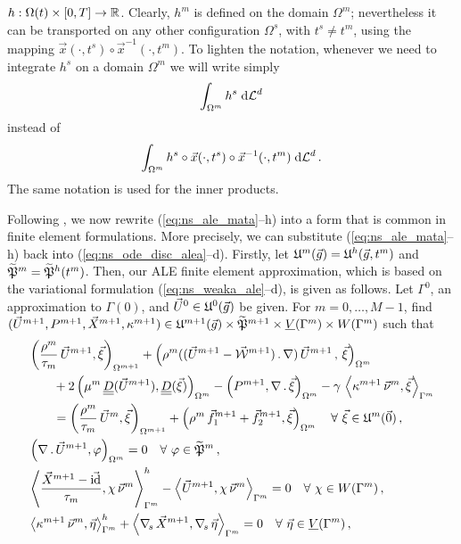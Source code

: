 $h:\Omega(t)\times[0,T]\to\R$. Clearly, $h^m$ is defined on the domain
$\Omega^m$; nevertheless it can be transported on any other configuration
$\Omega^s$, with $t^s\neq t^m$, using the mapping $\vec x(\cdot,t^s)\circ{\vec
x}^{-1}(\cdot,t^m)$. To lighten the notation, whenever we need to integrate
$h^s$ on a domain $\Omega^m$ we will write simply
\begin{equation*}
\int_{\Omega^m} h^s \dL d
\end{equation*}
instead of
\begin{equation*}
\int_{\Omega^m} h^s\circ \vec x(\cdot,t^s)\circ{\vec x}^{-1}(\cdot,t^m)\dL d\,.
\end{equation*}
The same notation is used for the inner products.

Following \cite{NobilePhd}, we now rewrite (\ref{eq:ns_ale_mata}--h) into a
form that is common in finite element formulations. More precisely, we can
substitute (\ref{eq:ns_ale_mata}--h) back into (\ref{eq:ns_ode_disc_alea}--d).
Firstly, let $\uspacediscale{g}{m}=\uspacesemidiscale{g}{h}{t^m}$ and
$\pnormspaceale^m=\pnormspaceale^h(t^m)$. Then, our ALE finite element
approximation, which is based on the variational formulation
(\ref{eq:ns_weaka_ale}--d), is given as follows. Let $\Gamma^0$, an
approximation to $\Gamma(0)$, and $\vec U^0\in \uspacediscale{g}{0}$ be given.
For $m=0,\ldots, M-1$, find $(\vec U^{m+1},P^{m+1}, \vec X^{m+1}, \kappa^{m+1})
\in \uspacediscale{g}{m+1}\times \pnormspaceale^{m+1} \times \Vh \times \Wh$
such that
\begin{subequations}
\begin{align}
& \left( \frac{\rho^m}{\tau_m}\,\vec U^{m+1}, \vec \xi \right)_{\Omega^{m+1}}
+ \left(\rho^m( (\vec U^{m+1}- \W^{m+1})\,.\,\nabla)\,\vec U^{m+1}\,,
\,\vec \xi \right)_{\Omega^m}\nonumber \\
& \qquad + 2\left(\mu^m\,\mat D(\vec U^{m+1}), \mat D(\vec \xi)
\right)_{\Omega^m} - \left(P^{m+1}, \nabla\,.\,\vec \xi\right)_{\Omega^m}
- \gamma\,\left\langle \kappa^{m+1}\,\vec\nu^m , \vec\xi\right\rangle_{\Gamma^m}
\nonumber \\
& \qquad=  \left(\frac{\rho^m}{\tau_m}\,\vec U^m,\vec \xi \right)_{\Omega^{m+1}}
+ \left(\rho^m\,\vec f_1^{m+1}+\vec f_2^{m+1}, \vec \xi\right)_{\Omega^m}
\quad \forall\ \vec\xi \in \uspacediscale{0}{m}\,, \label{eq:ale_HGa} \\
& \left(\nabla\,.\,\vec U^{m+1}, \varphi\right)_{\Omega^m}  = 0
\quad \forall\ \varphi \in \pnormspaceale^m\,,\label{eq:ale_HGb} \\
&  \left\langle \frac{\vec X^{m+1} - \vec\id}{\tau_m} ,\chi\,\vec\nu^m
\right\rangle_{\Gamma^m}^h - \left\langle \vec U^{m+1}, \chi\,\vec\nu^m
\right\rangle_{\Gamma^m}  = 0 \quad \forall\ \chi \in \Wh\,,
\label{eq:ale_HGc}\\
& \left\langle \kappa^{m+1}\,\vec\nu^m, \vec\eta \right\rangle_{\Gamma^m}^h
+ \left\langle \nabs\,\vec X^{m+1}, \nabs\,\vec \eta \right\rangle_{\Gamma^m} =
0 \quad \forall\ \vec\eta \in \Vh\,, \label{eq:ale_HGd}
\end{align}
\end{subequations}
